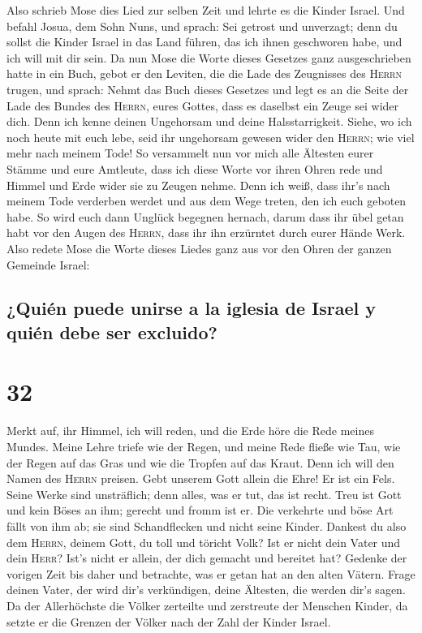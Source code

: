  Also schrieb Mose dies Lied zur selben Zeit und lehrte
es die Kinder Israel.  Und befahl Josua, dem Sohn Nuns,
und sprach: Sei getrost und unverzagt; denn du sollst die Kinder Israel
in das Land führen, das ich ihnen geschworen habe, und ich will mit dir
sein.  Da nun Mose die Worte dieses Gesetzes ganz
ausgeschrieben hatte in ein Buch,  gebot er den Leviten,
die die Lade des Zeugnisses des \textsc{Herrn} trugen, und sprach:
 Nehmt das Buch dieses Gesetzes und legt es an die Seite
der Lade des Bundes des \textsc{Herrn}, eures Gottes, dass es daselbst
ein Zeuge sei wider dich.  Denn ich kenne deinen
Ungehorsam und deine Halsstarrigkeit. Siehe, wo ich noch heute mit euch
lebe, seid ihr ungehorsam gewesen wider den \textsc{Herrn}; wie viel
mehr nach meinem Tode!  So versammelt nun vor mich alle
Ältesten eurer Stämme und eure Amtleute, dass ich diese Worte vor ihren
Ohren rede und Himmel und Erde wider sie zu Zeugen nehme.
 Denn ich weiß, dass ihr's nach meinem Tode verderben
werdet und aus dem Wege treten, den ich euch geboten habe. So wird euch
dann Unglück begegnen hernach, darum dass ihr übel getan habt vor den
Augen des \textsc{Herrn}, dass ihr ihn erzürntet durch eurer Hände Werk.
 Also redete Mose die Worte dieses Liedes ganz aus vor
den Ohren der ganzen Gemeinde Israel:

\hypertarget{quiuxe9n-puede-unirse-a-la-iglesia-de-israel-y-quiuxe9n-debe-ser-excluido}{%
\subsection{¿Quién puede unirse a la iglesia de Israel y quién debe ser
excluido?}\label{quiuxe9n-puede-unirse-a-la-iglesia-de-israel-y-quiuxe9n-debe-ser-excluido}}

\hypertarget{section-31}{%
\section{32}\label{section-31}}

 Merkt auf, ihr Himmel, ich will reden, und die Erde höre
die Rede meines Mundes.  Meine Lehre triefe wie der Regen,
und meine Rede fließe wie Tau, wie der Regen auf das Gras und wie die
Tropfen auf das Kraut.  Denn ich will den Namen des
\textsc{Herrn} preisen. Gebt unserem Gott allein die Ehre!
 Er ist ein Fels. Seine Werke sind unsträflich; denn
alles, was er tut, das ist recht. Treu ist Gott und kein Böses an ihm;
gerecht und fromm ist er.  Die verkehrte und böse Art
fällt von ihm ab; sie sind Schandflecken und nicht seine Kinder.
 Dankest du also dem \textsc{Herrn}, deinem Gott, du toll
und töricht Volk? Ist er nicht dein Vater und dein \textsc{Herr}? Ist's
nicht er allein, der dich gemacht und bereitet hat? 
Gedenke der vorigen Zeit bis daher und betrachte, was er getan hat an
den alten Vätern. Frage deinen Vater, der wird dir's verkündigen, deine
Ältesten, die werden dir's sagen.  Da der Allerhöchste die
Völker zerteilte und zerstreute der Menschen Kinder, da setzte er die
Grenzen der Völker nach der Zahl der Kinder Israel.


